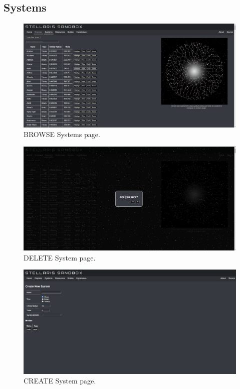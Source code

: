 \documentclass[12pt]{article}
\let\Oldsubsection\subsection
\renewcommand{\subsection}{\FloatBarrier\Oldsubsection}
\begin{document}
\newpage
\subsection{Systems}

\begin{figure}[!ht]
  \caption{BROWSE Systems page.}
  \includegraphics[width=\textwidth]{screenshots/systems/systems_browse.png}
\end{figure}

\begin{figure}[!ht]
  \caption{DELETE System page.}
  \includegraphics[width=\textwidth]{screenshots/systems/systems_delete.png}
\end{figure}

\begin{figure}[!ht]
  \caption{CREATE System page.}
  \includegraphics[width=\textwidth]{screenshots/systems/systems_create.png}
\end{figure}
\end{document}
